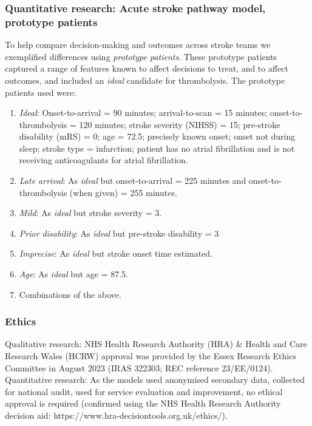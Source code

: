 
\subsubsection{Quantitative research: Acute stroke pathway model, prototype patients}

To help compare decision-making and outcomes across stroke teams we exemplified differences using \textit{prototype patients}. These prototype patients captured a range of features known to affect decisions to treat, and to affect outcomes, and included an \textit{ideal} candidate for thrombolysis. The prototype patients used were:

\begin{enumerate}
    \item \textit{Ideal}: Onset-to-arrival = 90 minutes; arrival-to-scan = 15 minutes; onset-to-thrombolysis = 120 minutes; stroke severity (NIHSS) = 15; pre-stroke disability (mRS) = 0; age = 72.5; precisely known onset; onset not during sleep; stroke type = infarction; patient has no atrial fibrillation and is not receiving anticoagulants for atrial fibrillation.

    \item \textit{Late arrival}: As \textit{ideal} but onset-to-arrival = 225 minutes and onset-to-thrombolysis (when given) = 255 minutes.

    \item \textit{Mild}: As \textit{ideal} but stroke severity = 3.

    \item \textit{Prior disability}: As \textit{ideal} but pre-stroke disability = 3

    \item \textit{Imprecise}: As \textit{ideal} but stroke onset time estimated.

    \item \textit{Age}: As \textit{ideal} but age = 87.5.

    \item Combinations of the above.
\end{enumerate}

\subsubsection{Ethics}

Qualitative research: NHS Health Research Authority (HRA) \& Health and Care Research Wales (HCRW) approval was provided by the Essex Research Ethics Committee in August 2023 (IRAS 322303; REC reference 23/EE/0124). Quantitative research: As the models used anonymised secondary data, collected for national audit, used for service evaluation and improvement, no ethical approval is required (confirmed using the NHS Health Research Authority decision aid: https://www.hra-decisiontools.org.uk/ethics/).


